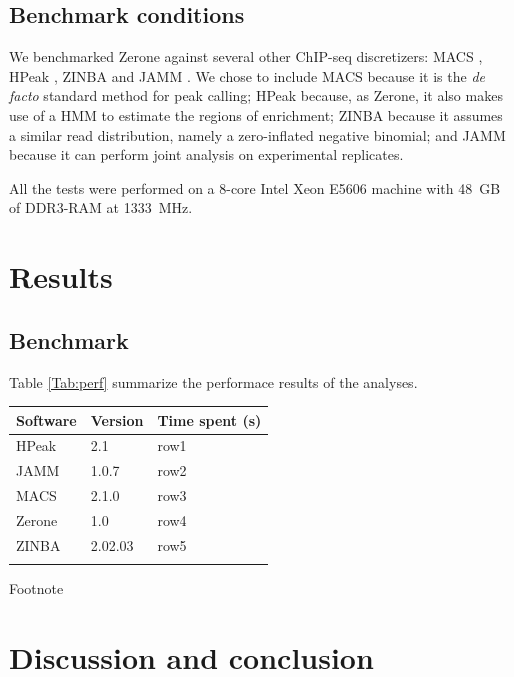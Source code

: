 \documentclass{bioinfo}
\begin{document}
\begin{methods}
\subsection{Benchmark conditions}
We benchmarked Zerone against several other ChIP-seq discretizers: MACS
\citep{Zhang2008}, HPeak \citep{Qin2010}, ZINBA \citep{Rashid2011} and
JAMM \citep{Ibrahim2014}. We chose to include MACS because it is the
\emph{de facto} standard method for peak calling; HPeak because, as Zerone, it
also makes use of a HMM to estimate the regions of enrichment; ZINBA because it
assumes a similar read distribution, namely a zero-inflated negative binomial;
and JAMM because it can perform joint analysis on experimental replicates.

All the tests were performed on a 8-core Intel Xeon E5606 machine with 48~GB of
DDR3-RAM at 1333~MHz.

\end{methods}

\section{Results}


\subsection{Benchmark}
Table \ref{Tab:perf} summarize the performace results of the analyses.

\begin{table}[!t]
{\begin{tabular}{lll}\toprule
\bf{Software} & \bf{Version} & \bf{Time spent (s)} \\\midrule
HPeak & 2.1 & row1 \\
JAMM & 1.0.7 & row2 \\
MACS & 2.1.0 & row3 \\ %
Zerone & 1.0 & row4 \\
ZINBA & 2.02.03 & row5 \\\botrule
\end{tabular}}{Footnote}
\end{table}

\section{Discussion and conclusion}
\end{document}
